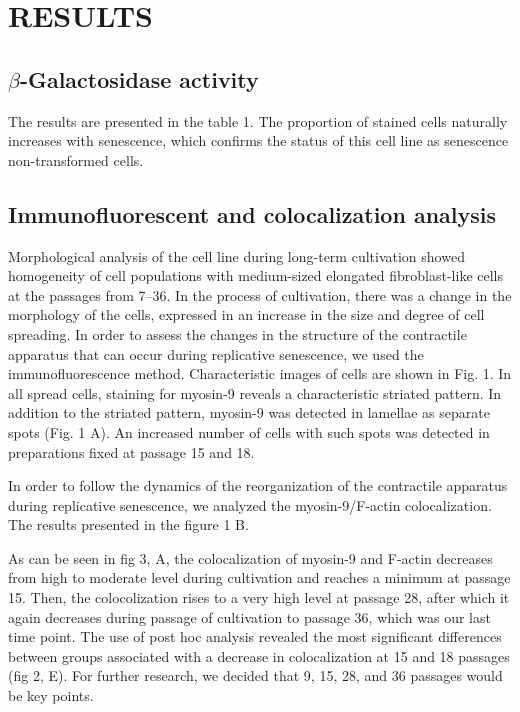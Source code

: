 \documentclass[alpha-refs]{wiley-article}
\begin{document}
\section{RESULTS}

\subsection{$\beta$-Galactosidase activity}

The results are presented in the table 1.
The proportion of stained cells naturally increases with senescence, which confirms the status of this cell line as senescence non-transformed cells.

\subsection{Immunofluorescent and colocalization analysis}

Morphological analysis of the cell line during long-term cultivation showed homogeneity of cell populations with medium-sized elongated fibroblast-like cells at the passages from 7--36.
In the process of cultivation, there was a change in the morphology of the cells, expressed in an increase in the size and degree of cell spreading.
In order to assess the changes in the structure of the contractile apparatus that can occur during replicative senescence, we used the immunofluorescence method.
Characteristic images of cells are shown in Fig. 1.
In all spread cells, staining for myosin-9 reveals a characteristic striated pattern.
In addition to the striated pattern, myosin-9 was detected in lamellae as separate spots (Fig. 1 A).
An increased number of cells with such spots was detected in preparations fixed at passage 15 and 18.

In order to follow the dynamics of the reorganization of the contractile apparatus during replicative senescence, we analyzed the myosin-9/F-actin colocalization.
The results presented in the figure 1 B.

As can be seen in fig 3, A, the colocalization of myosin-9 and F-actin decreases from high to moderate level during cultivation and reaches a minimum at passage 15.
Then, the colocolization rises to a very high level at passage 28, after which it again decreases during passage of cultivation to passage 36, which was our last time point.
The use of post hoc analysis revealed the most significant differences between groups associated with a decrease in colocalization at 15 and 18 passages (fig 2, E).
For further research, we decided that 9, 15, 28, and 36 passages would be key points.
\end{document}
